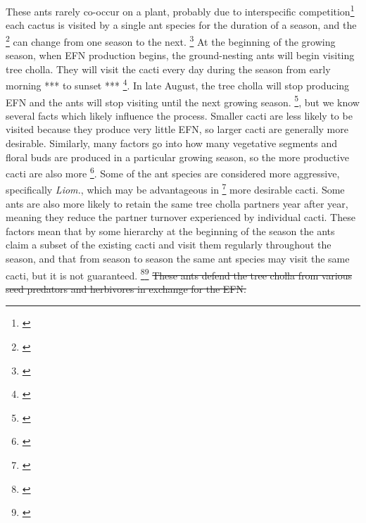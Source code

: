 \documentclass[12pt,a4paper]{article}
\newcommand{\tom}[2]{{\color{red}{#1}}\footnote{\textit{\color{red}{#2}}}}
\newcommand{\ali}[2]{{\color{pink}{#1}}\footnote{\textit{\color{pink}{#2}}}}
\begin{document}
These ants rarely co-occur on a plant, probably due to interspecific competition\cite{Miller2007}\tom{, rather}{Grammatically awkward. I would start a new sentence Instead, each cactus} each cactus is visited by a single ant species for the duration of a season, and the \tom{visitor}{What do you mean by visitor? Is each individual ant a visitor?} can change from one season to the next. 
\tom{Across the entire lifespan cacti may interact with multiple species of partners. }{This is implied by the sentences above so there is no new information here.}
At the beginning of the growing season, when EFN production begins, the ground-nesting ants will begin visiting tree cholla.
They will visit the cacti every day during the season from early morning *** to sunset *** \tom{abandoning the cacti at night for their nests}{Incorrect. See Ohm and Miller 2014.}. 
In late August, the tree cholla will stop producing EFN and the ants will stop visiting until the next growing season. 
\tom{The process by which ants are sorted out onto different cacti is somewhat of a mystery}{too colloquial}, but we know several facts which likely influence the process. 
Smaller cacti are less likely to be visited because they produce very little EFN, so larger cacti are generally more desirable\cite{Miller2014}. 
Similarly, many factors go into how many vegetative segments and floral buds are produced in a particular growing season, so the more productive cacti are also more \tom{desirable}{I don't yhink we should speculate about ants' desires.}. 
Some of the ant species are considered more aggressive, specifically \textit{Liom.}\cite{Miller2007}, which may be advantageous in \tom{going after}{too colloquial} more desirable cacti. 
Some ants are also more likely to retain the same tree cholla partners year after year, meaning they reduce the partner turnover experienced by individual cacti. 
These factors mean that by some hierarchy at the beginning of the season the ants claim a subset of the existing cacti and visit them regularly throughout the season, and that from season to season the same ant species may visit the same cacti, but it is not guaranteed. 
\ali{Note.}{I am not sure how much of this I should include here, since some of the turnover info is results from this paper?}\tom{}{Yes this is what I was thinnking as i was reading. Much of this fall out of the results of your analysis. I would significantly reduce this paragraph. Think about what your readers need to know to process what's to come.}
\st{These ants defend the tree cholla from various seed predators and herbivores in exchange for the EFN.} 
\end{document}
